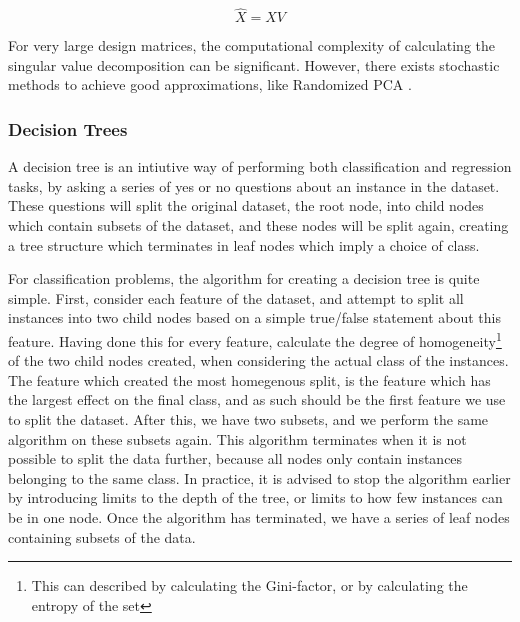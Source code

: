 \documentclass[onecolumn,10pt,cleanfoot]{asme2ej}
\begin{document}
\begin{equation}
\hat{X} = XV
\end{equation}

For very large design matrices, the computational complexity of calculating the singular value decomposition can be significant. However, there exists stochastic methods to achieve good approximations, like Randomized PCA \cite[227]{halko}.


\subsubsection{Decision Trees}

A decision tree is an intiutive way of performing both classification and regression tasks, by asking a series of yes or no questions about an instance in the dataset. These questions will split the original dataset, the root node, into child nodes which contain subsets of the dataset, and these nodes will be split again, creating a tree structure which terminates in leaf nodes which imply a choice of class.

For classification problems, the algorithm for creating a decision tree is quite simple. First, consider each feature of the dataset, and attempt to split all instances into two child nodes based on a simple true/false statement about this feature. Having done this for every feature, calculate the degree of homogeneity\footnote{This can described by calculating the Gini-factor, or by calculating the entropy of the set} of the two child nodes created, when considering the actual class of the instances. The feature which created the most homegenous split, is the feature which has the largest effect on the final class, and as such should be the first feature we use to split the dataset. After this, we have two subsets, and we perform the same algorithm on these subsets again. This algorithm terminates when it is not possible to split the data further, because all nodes only contain instances belonging to the same class. In practice, it is advised to stop the algorithm earlier by introducing limits to the depth of the tree, or limits to how few instances can be in one node. Once the algorithm has terminated, we have a series of leaf nodes containing subsets of the data.
\end{document}
